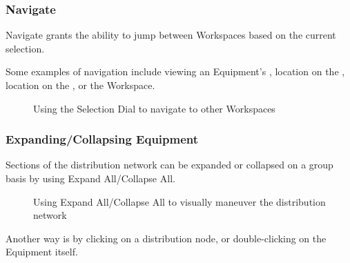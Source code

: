 \documentclass[letterpaper,10pt,english]{sphinxmanual}
\begin{document}
\subsubsection{Navigate}
\label{\detokenize{docs/userguide/buildingelectricalmodel/one-line/index-one-line:navigate}}
Navigate grants the ability to jump between Workspaces based on the current selection.

Some examples of navigation include viewing an Equipment’s {\hyperref[\detokenize{docs/userguide/buildingelectricalmodel/schedules/index-schedules:schedules}]{}}, location on the {\hyperref[\detokenize{docs/userguide/buildingelectricalmodel/riser/index-riser:riser}]{}}, location on the {\hyperref[\detokenize{docs/userguide/definingarchitecturalelements/floorplans/index-floor-plans:floor-plans}]{}}, or the {\hyperref[\detokenize{docs/userguide/buildingelectricalmodel/studies/index-studies:studies}]{}} Workspace.

\begin{figure}[H]
\centering
\capstart

\noindent{}
\caption{Using the Selection Dial to navigate to other Workspaces}\label{\detokenize{docs/userguide/buildingelectricalmodel/one-line/index-one-line:id9}}\end{figure}


\subsubsection{Expanding/Collapsing Equipment}
\label{\detokenize{docs/userguide/buildingelectricalmodel/one-line/index-one-line:expanding-collapsing-equipment}}
Sections of the distribution network can be expanded or collapsed on a group basis by using Expand All/Collapse All.

\begin{figure}[H]
\centering
\capstart

\noindent{}
\caption{Using Expand All/Collapse All to visually maneuver the distribution network}\label{\detokenize{docs/userguide/buildingelectricalmodel/one-line/index-one-line:id10}}\end{figure}

Another way is by clicking on a distribution node, or double-clicking on the Equipment itself.
\end{document}
